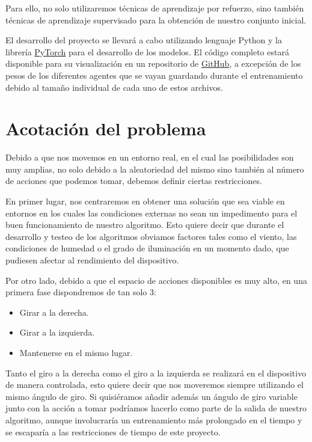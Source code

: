 Para ello, no solo utilizaremos técnicas de aprendizaje por refuerzo, sino también técnicas de aprendizaje supervisado para la obtención de nuestro conjunto inicial.
\medskip

El desarrollo del proyecto se llevará a cabo utilizando lenguaje Python y la librería \href{https://pytorch.org/}{PyTorch} para el desarrollo de los modelos. El código completo estará disponible para su visualización en un repositorio de \href{https://github.com/lucaswerner90/msc-degree-ai}{GitHub}, a excepción de los pesos de los diferentes agentes que se vayan guardando durante el entrenamiento debido al tamaño individual de cada uno de estos archivos.


\section{Acotación del problema}
\label{acotacion-del-problema}

Debido a que nos movemos en un entorno real, en el cual las posibilidades son muy amplias, no solo debido a la aleatoriedad del mismo sino también al número de acciones que podemos tomar, debemos definir ciertas restricciones.
\medskip

En primer lugar, nos centraremos en obtener una solución que sea viable en entornos en los cuales las condiciones externas no sean un impedimento para el buen funcionamiento de nuestro algoritmo. Esto quiere decir que durante el desarrollo y testeo de los algoritmos obviamos factores tales como el viento, las condiciones de humedad o el grado de iluminación en un momento dado, que pudiesen afectar al rendimiento del dispositivo.
\medskip

Por otro lado, debido a que el espacio de acciones disponibles es muy alto, en una primera fase dispondremos de tan solo 3: 

\begin{itemize}
  \item Girar a la derecha.
  \item Girar a la izquierda.
  \item Mantenerse en el mismo lugar.
\end{itemize}
\medskip

Tanto el giro a la derecha como el giro a la izquierda se realizará en el dispositivo de manera controlada, esto quiere decir que nos moveremos siempre utilizando el mismo ángulo de giro. Si quisiéramos añadir además un ángulo de giro variable junto con la acción a tomar podríamos hacerlo como parte de la salida de nuestro algoritmo, aunque involucraría un entrenamiento más prolongado en el tiempo y se escaparía a las restricciones de tiempo de este proyecto.
\medskip

